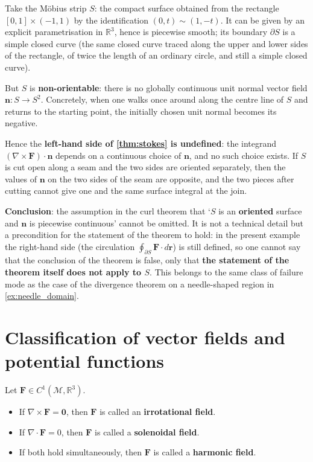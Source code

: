 \begin{example}\label{ex:stokes_nonclosed_surface}
Take the Möbius strip $S$: the compact surface obtained from the rectangle $[0,1]\times(-1,1)$ by the identification $(0,t)\sim(1,-t)$. It can be given by an explicit parametrisation in $\mathbb R^3$, hence is piecewise smooth; its boundary $\partial S$ is a simple closed curve (the same closed curve traced along the upper and lower sides of the rectangle, of twice the length of an ordinary circle, and still a simple closed curve).

But $S$ is \textbf{non-orientable}: there is no globally continuous unit normal vector field $\mathbf n: S\to S^2$. Concretely, when one walks once around along the centre line of $S$ and returns to the starting point, the initially chosen unit normal becomes its negative.

Hence the \textbf{left-hand side of \cref{thm:stokes} is undefined}: the integrand $(\nabla\times\mathbf F)\cdot\mathbf n$ depends on a continuous choice of $\mathbf n$, and no such choice exists. If $S$ is cut open along a seam and the two sides are oriented separately, then the values of $\mathbf n$ on the two sides of the seam are opposite, and the two pieces after cutting cannot give one and the same surface integral at the join.

\textbf{Conclusion}: the assumption in the curl theorem that `$S$ is an \textbf{oriented} surface and $\mathbf n$ is piecewise continuous' cannot be omitted. It is not a technical detail but a precondition for the statement of the theorem to hold: in the present example the right-hand side (the circulation $\oint_{\partial S}\mathbf F\cdot d\mathbf r$) is still defined, so one cannot say that the conclusion of the theorem is false, only that \textbf{the statement of the theorem itself does not apply to $S$}. This belongs to the same class of failure mode as the case of the divergence theorem on a needle-shaped region in \cref{ex:needle_domain}.
\end{example}

\section{Classification of vector fields and potential functions}

\begin{definition}\label{def:field_types}
Let $\mathbf{F} \in C^1(\mathcal{M}, \mathbb{R}^3)$.
\begin{itemize}
    \item If $\nabla \times \mathbf{F} = \mathbf{0}$, then $\mathbf{F}$ is called an \textbf{irrotational field}.
    \item If $\nabla \cdot \mathbf{F} = 0$, then $\mathbf{F}$ is called a \textbf{solenoidal field}.
    \item If both hold simultaneously, then $\mathbf{F}$ is called a \textbf{harmonic field}.
\end{itemize}
\end{definition}

